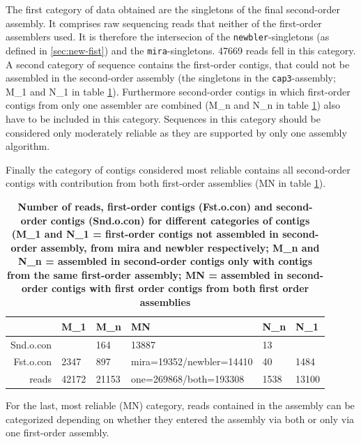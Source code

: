 \documentclass[12pt,a4paper]{article}
\begin{document}
The first category of data obtained are the singletons of the final
second-order assembly. It comprises raw sequencing reads that neither
of the first-order assemblers used. It is therefore the intersecion of
the \texttt{newbler}-singletons (as defined in \ref{sec:new-fist}) and
the \texttt{mira}-singletons. 47669 reads fell in this
category. 
A second category of sequence contains the first-order contigs,
that could not be assembled in the second-order assembly (the
singletons in the \texttt{cap3}-assembly; M\_1 and N\_1 in table
\ref{tab:categ}). Furthermore second-order contigs in which
first-order contigs from only one assembler are combined (M\_n and
N\_n in table \ref{tab:categ}) also have to be included in this
category. Sequences in this category should be considered only
moderately reliable as they are supported by only one assembly
algorithm.

Finally the category of contigs considered most reliable contains all
second-order contigs with contribution from both first-order
assemblies (MN in table \ref{tab:categ}).

\begin{table}[ht]
\begin{center}
\begin{tabular}{rlllll}
  \hline
 & M\_1 & M\_n & MN & N\_n & N\_1 \\ 
  \hline
Snd.o.con &   & 164 & 13887 & 13 &   \\ 
  Fst.o.con & 2347 & 897 & mira=19352/newbler=14410 & 40 & 1484 \\ 
  reads & 42172 & 21153 & one=269868/both=193308 & 1538 & 13100 \\ 
   \hline
\end{tabular}
\caption{\small{\textbf{Number of reads, first-order contigs (Fst.o.con) and second-order contigs (Snd.o.con) for different categories of contigs (M\_1 and N\_1 = first-order contigs not assembled in second-order assembly, from mira and newbler respectively; M\_n and N\_n =  assembled in second-order contigs only with contigs from the same first-order assembly; MN = assembled in second-order contigs with first order contigs from both first order assemblies}}}
\label{tab:categ}
\end{center}
\end{table}
For the last, most reliable (MN) category, reads contained in the
assembly can be categorized depending on whether they entered the
assembly via both or only via one first-order assembly. 
\end{document}
